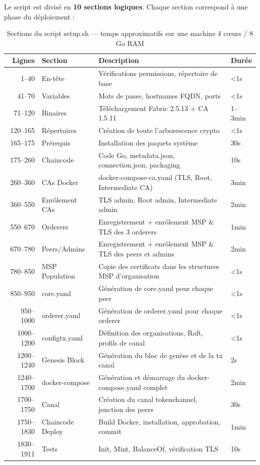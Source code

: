 \documentclass[12pt,a4paper,twoside]{report}
\begin{document}
Le script est divisé en \textbf{10 sections logiques}. Chaque section correspond à une phase du déploiement :

\begin{table}[H]
\centering
\begin{tabularx}{\textwidth}{rlXl}
\toprule
\textbf{Lignes} & \textbf{Section} & \textbf{Description} & \textbf{Durée} \\
\midrule
1--40 & En-tête & Vérifications permissions, répertoire de base & <1s \\
41--70 & Variables & Mots de passe, hostnames FQDN, ports & <1s \\
71--120 & Binaires & Téléchargement Fabric 2.5.13 + CA 1.5.11 & 1--3min \\
120--165 & Répertoires & Création de toute l'arborescence crypto & <1s \\
165--175 & Prérequis & Installation des paquets système & 30s \\
175--260 & Chaincode & Code Go, metadata.json, connection.json, packaging & 10s \\
260--360 & CAs Docker & docker-compose-ca.yaml (TLS, Root, Intermediate CA) & 3min \\
360--550 & Enrôlement CAs & TLS admin, Root admin, Intermediate admin & 2min \\
550--670 & Orderers & Enregistrement + enrôlement MSP \& TLS des 3 orderers & 1min \\
670--780 & Peers/Admins & Enregistrement + enrôlement MSP \& TLS des peers et admins & 2min \\
780--850 & MSP Population & Copie des certificats dans les structures MSP d'organisation & <1s \\
850--950 & core.yaml & Génération de core.yaml pour chaque peer & <1s \\
950--1000 & orderer.yaml & Génération de orderer.yaml pour chaque orderer & <1s \\
1000--1200 & configtx.yaml & Définition des organisations, Raft, profils de canal & <1s \\
1200--1240 & Genesis Block & Génération du bloc de genèse et de la tx canal & 2s \\
1240--1700 & docker-compose & Génération et démarrage du docker-compose.yaml complet & 2min \\
1700--1750 & Canal & Création du canal tokenchannel, jonction des peers & 30s \\
1750--1830 & Chaincode Deploy & Build Docker, installation, approbation, commit & 1min \\
1830--1911 & Tests & Init, Mint, BalanceOf, vérification TLS & 10s \\
\bottomrule
\end{tabularx}
\caption{Sections du script setup.sh --- temps approximatifs sur une machine 4 cœurs / 8 Go RAM}
\end{table}
\end{document}
